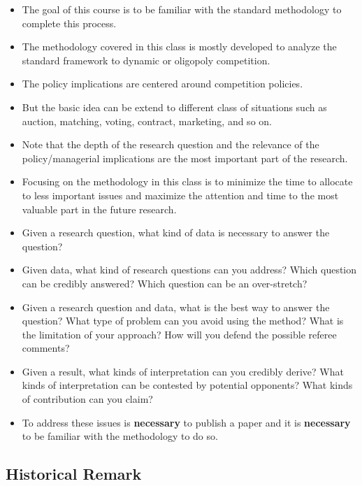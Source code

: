 \documentclass[]{book}
\providecommand{\tightlist}{%
  \setlength{\itemsep}{0pt}\setlength{\parskip}{0pt}}
\begin{document}
\begin{itemize}
\tightlist
\item
  The goal of this course is to be familiar with the standard
  methodology to complete this process.
\item
  The methodology covered in this class is mostly developed to analyze
  the standard framework to dynamic or oligopoly competition.
\item
  The policy implications are centered around competition policies.
\item
  But the basic idea can be extend to different class of situations such
  as auction, matching, voting, contract, marketing, and so on.
\item
  Note that the depth of the research question and the relevance of the
  policy/managerial implications are the most important part of the
  research.
\item
  Focusing on the methodology in this class is to minimize the time to
  allocate to less important issues and maximize the attention and time
  to the most valuable part in the future research.
\item
  Given a research question, what kind of data is necessary to answer
  the question?
\item
  Given data, what kind of research questions can you address? Which
  question can be credibly answered? Which question can be an
  over-stretch?
\item
  Given a research question and data, what is the best way to answer the
  question? What type of problem can you avoid using the method? What is
  the limitation of your approach? How will you defend the possible
  referee comments?
\item
  Given a result, what kinds of interpretation can you credibly derive?
  What kinds of interpretation can be contested by potential opponents?
  What kinds of contribution can you claim?
\item
  To address these issues is \textbf{necessary} to publish a paper and
  it is \textbf{necessary} to be familiar with the methodology to do so.
\end{itemize}

\subsection{Historical Remark}\label{historical-remark}
\end{document}
